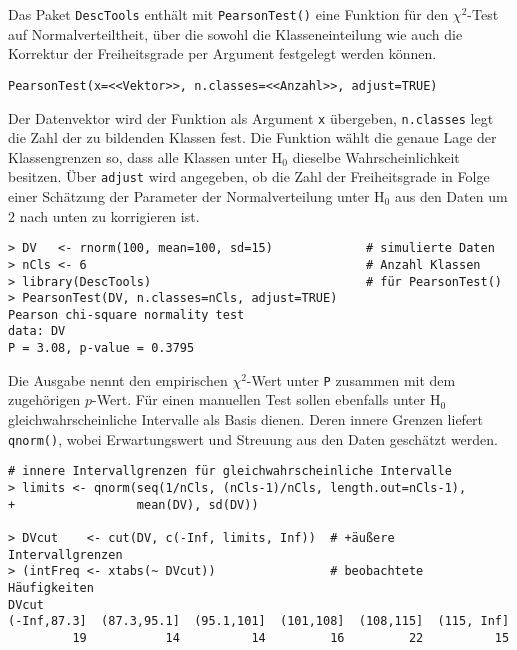 Das Paket \lstinline!DescTools! enthält mit \lstinline!PearsonTest()! eine Funktion für den $\chi^{2}$-Test auf Normalverteiltheit, über die sowohl die Klasseneinteilung wie auch die Korrektur der Freiheitsgrade per Argument festgelegt werden können.
\begin{lstlisting}
PearsonTest(x=<<Vektor>>, n.classes=<<Anzahl>>, adjust=TRUE)
\end{lstlisting}

Der Datenvektor wird der Funktion als Argument \lstinline!x! übergeben, \lstinline!n.classes! legt die Zahl der zu bildenden Klassen fest. Die Funktion wählt die genaue Lage der Klassengrenzen so, dass alle Klassen unter $\text{H}_{0}$ dieselbe Wahrscheinlichkeit besitzen. Über \lstinline!adjust! wird angegeben, ob die Zahl der Freiheitsgrade in Folge einer Schätzung der Parameter der Normalverteilung unter $\text{H}_{0}$ aus den Daten um $2$ nach unten zu korrigieren ist.

\begin{lstlisting}
> DV   <- rnorm(100, mean=100, sd=15)             # simulierte Daten
> nCls <- 6                                       # Anzahl Klassen
> library(DescTools)                              # für PearsonTest()
> PearsonTest(DV, n.classes=nCls, adjust=TRUE)
Pearson chi-square normality test
data: DV
P = 3.08, p-value = 0.3795
\end{lstlisting}

Die Ausgabe nennt den empirischen $\chi^{2}$-Wert unter \lstinline!P! zusammen mit dem zugehörigen $p$-Wert. Für einen manuellen Test sollen ebenfalls unter $\text{H}_{0}$ gleichwahrscheinliche Intervalle als Basis dienen. Deren innere Grenzen liefert \lstinline!qnorm()!, wobei Erwartungswert und Streuung aus den Daten geschätzt werden.
\begin{lstlisting}
# innere Intervallgrenzen für gleichwahrscheinliche Intervalle
> limits <- qnorm(seq(1/nCls, (nCls-1)/nCls, length.out=nCls-1),
+                 mean(DV), sd(DV))

> DVcut    <- cut(DV, c(-Inf, limits, Inf))  # +äußere Intervallgrenzen
> (intFreq <- xtabs(~ DVcut))                # beobachtete Häufigkeiten
DVcut
(-Inf,87.3]  (87.3,95.1]  (95.1,101]  (101,108]  (108,115]  (115, Inf]
         19           14          14         16         22          15
\end{lstlisting}


